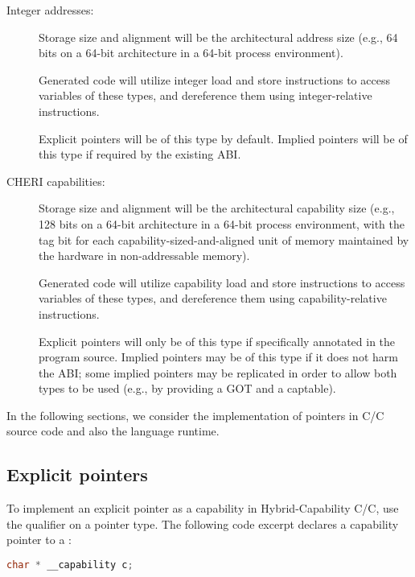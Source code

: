 \documentclass[12pt,twoside,openright,a4paper]{article}
\newcommand{\ccode}[1]{{\small\ttfamily{#1}}}
\newcommand{\uucap}{{\ccode{\_\_capability}}\xspace}
\newcommand{\note}[2]{{\color{blue}[ Note: #1 - #2]}}
\renewcommand{\note}[2]{\relax\ifhmode\unskip\fi}
\newcommand{\arnote}[1]{\note{#1}{Alex R.}}
\newcommand*{\cpp}{\texorpdfstring{C\textsmaller[2]{\protect\nolinebreak[4]\hspace{-.05em}\raisebox{.45ex}{\textbf{++}}}}{C++}}
\newcommand*{\COrCpp}{C/\cpp{}}
\newcommand*{\hybridCOrCpp}{Hybrid-Capability \COrCpp{}}
\begin{document}
\begin{description}
\item[Integer addresses:]
  Storage size and alignment will be the architectural address size (e.g.,
  64 bits on a 64-bit architecture in a 64-bit process environment).

  Generated code will utilize integer load and store instructions to access
  variables of these types, and dereference them using integer-relative
  instructions.

  Explicit pointers will be of this type by default.
  Implied pointers will be of this type if required by the existing ABI.

\item[CHERI capabilities:]
  Storage size and alignment will be the architectural capability size (e.g.,
  128 bits on a 64-bit architecture in a 64-bit process environment, with the
  tag bit for each capability-sized-and-aligned unit of memory maintained by
  the hardware in non-addressable memory).

  Generated code will utilize capability load and store instructions to access
  variables of these types, and dereference them using capability-relative
  instructions.

  Explicit pointers will only be of this type if specifically annotated in the
  program source.
  Implied pointers may be of this type if it does not harm the ABI; some
  implied pointers may be replicated in order to allow both types to be used
  (e.g., by providing a GOT and a captable).
\end{description}

\noindent
In the following sections, we consider the implementation of pointers in
C/\cpp{} source code and also the language runtime.

\arnote{There is still a lot of duplication here, will try to reword it more later.}

\subsection{Explicit pointers}

To implement an explicit pointer as a capability in \hybridCOrCpp{}, use the
qualifier \uucap{} on a pointer type.
The following code excerpt declares a capability pointer to a \ccode{char}:

\begin{lstlisting}[language=C]
char * __capability c;
\end{lstlisting}
\end{document}
